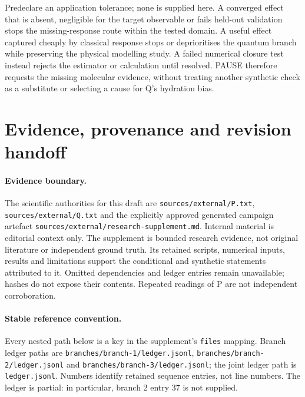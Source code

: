 \documentclass{article}
\begin{document}
Predeclare an application tolerance; none is supplied here. A converged effect that is absent, negligible for the target observable or fails held-out validation stops the missing-response route within the tested domain. A useful effect captured cheaply by classical response stops or deprioritises the quantum branch while preserving the physical modelling study. A failed numerical closure test instead rejects the estimator or calculation until resolved. PAUSE therefore requests the missing molecular evidence, without treating another synthetic check as a substitute or selecting a cause for Q's hydration bias.

\appendix
\section{Evidence, provenance and revision handoff}

\paragraph{Evidence boundary.}
The scientific authorities for this draft are \texttt{sources/external/P.txt}, \texttt{sources/external/Q.txt} and the explicitly approved generated campaign artefact \texttt{sources/external/research-supplement.md}. Internal material is editorial context only. The supplement is bounded research evidence, not original literature or independent ground truth. Its retained scripts, numerical inputs, results and limitations support the conditional and synthetic statements attributed to it. Omitted dependencies and ledger entries remain unavailable; hashes do not expose their contents. Repeated readings of P are not independent corroboration.

\paragraph{Stable reference convention.}
Every nested path below is a key in the supplement's \texttt{files} mapping. Branch ledger paths are \texttt{branches/branch-1/ledger.jsonl}, \texttt{branches/branch-2/ledger.jsonl} and \texttt{branches/branch-3/ledger.jsonl}; the joint ledger path is \texttt{ledger.jsonl}. Numbers identify retained sequence entries, not line numbers. The ledger is partial: in particular, branch 2 entry 37 is not supplied.
\end{document}
